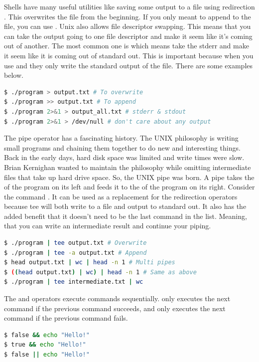 Shells have many useful utilities like saving some output to a file using redirection \keyword{>}.
This overwrites the file from the beginning.
If you only meant to append to the file, you can use \keyword{>>}.
Unix also allows file descriptor swapping.
This means that you can take the output going to one file descriptor and make it seem like it's coming out of another.
The most common one is  which means take the stderr and make it seem like it is coming out of standard out.
This is important because when you use \keyword{>} and \keyword{>>} they only write the standard output of the file.
There are some examples below.

\begin{lstlisting}[language=bash]
$ ./program > output.txt # To overwrite
$ ./program >> output.txt # To append
$ ./program 2>&1 > output_all.txt # stderr & stdout
$ ./program 2>&1 > /dev/null # don't care about any output
\end{lstlisting}

The pipe operator has a fascinating history.
The UNIX philosophy is writing small programs and chaining them together to do new and interesting things.
Back in the early days, hard disk space was limited and write times were slow.
Brian Kernighan wanted to maintain the philosophy while omitting intermediate files that take up hard drive space.
So, the UNIX pipe was born.
A pipe takes the  of the program on its left and feeds it to the  of the program on its right.
Consider the command .
It can be used as a replacement for the redirection operators because tee will both write to a file and output to standard out.
It also has the added benefit that it doesn't need to be the last command in the list. Meaning, that you can write an intermediate result and continue your piping.

\begin{lstlisting}[language=bash]
$ ./program | tee output.txt # Overwrite
$ ./program | tee -a output.txt # Append
$ head output.txt | wc | head -n 1 # Multi pipes
$ ((head output.txt) | wc) | head -n 1 # Same as above
$ ./program | tee intermediate.txt | wc
\end{lstlisting}

The \keyword{\&\&} and \keyword{||} operators execute commands sequentially. \keyword{\&\&} only executes the next command if the previous command succeeds, and \keyword{||} only executes the next command if the previous command fails.

\begin{lstlisting}[language=bash]
$ false && echo "Hello!"
$ true && echo "Hello!"
$ false || echo "Hello!"
\end{lstlisting}

